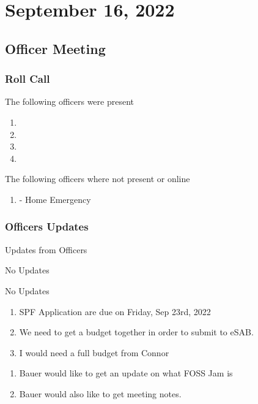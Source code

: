 \section{September 16, 2022}
\subsection{Officer Meeting}

\subsubsection{Roll Call}

The following officers were present

\begin{enumerate}
    \item \president
    \item \secretary
    \item \tresurer
    \item \primaryprogrammer
\end{enumerate}

The following officers where not present or online

\begin{enumerate}
    \item \vicepresident - Home Emergency 
\end{enumerate}

\subsubsection{Officers Updates}
Updates from Officers

\textbf{\president}

No Updates

\textbf{\secretary}

No Updates

\textbf{\tresurer}

\begin{enumerate}
    \item SPF Application are due on Friday, Sep 23rd, 2022
    \item We need to get a budget together in order to submit to eSAB.
    \item I would need a full budget from Connor 
\end{enumerate}

\textbf{\primaryprogrammer}

\begin{enumerate}
    \item Bauer would like to get an update on what FOSS Jam is
    \item Bauer would also like to get meeting notes.
\end{enumerate}

